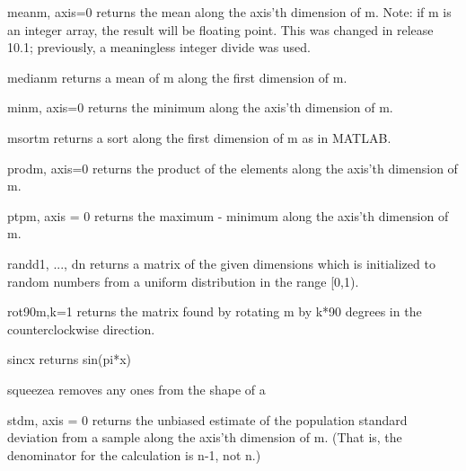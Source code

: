 \begin{funcdesc}{mean}{m, axis=0}
   \label{cha:mlab:mean}
   \label{func:mean}
   returns the mean along the axis'th dimension of m.  Note: if m is an integer
   array, the result will be floating point. This was changed in release 10.1;
   previously, a meaningless integer divide was used.
\end{funcdesc}
\begin{funcdesc}{median}{m}
   \label{cha:mlab:median}
   \label{func:median}
   returns a mean of m along the first dimension of m.
\end{funcdesc}
\begin{funcdesc}{min}{m, axis=0}
   \label{cha:mlab:min}
   \label{func:min}
   returns the minimum along the axis'th dimension of m.
\end{funcdesc}
\begin{funcdesc}{msort}{m}
   \label{cha:mlab:msort}
   \label{func:msort}
   returns a sort along the first dimension of m as in MATLAB.
\end{funcdesc}
\begin{funcdesc}{prod}{m, axis=0}
   \label{cha:mlab:prod}
   \label{func:prod}
   returns the product of the elements along the axis'th dimension of m.
\end{funcdesc}
\begin{funcdesc}{ptp}{m, axis = 0}
   \label{cha:mlab:ptp}
   \label{func:ptp}
   returns the maximum - minimum along the axis'th dimension of m.
\end{funcdesc}
\begin{funcdesc}{rand}{d1, ..., dn}
   \label{cha:mlab:rand}
   \label{func:rand}
   returns a matrix of the given dimensions which is initialized to random numbers from a uniform distribution in
the range [0,1).
\end{funcdesc}
\begin{funcdesc}{rot90}{m,k=1}
   \label{cha:mlab:rot90}
   \label{func:rot90}
   returns the matrix found by rotating m by k*90 degrees in the counterclockwise direction.
\end{funcdesc}
\begin{funcdesc}{sinc}{x}
   \label{cha:mlab:sinc}
   \label{func:sinc}
   returns sin(pi*x)
\end{funcdesc}
\begin{funcdesc}{squeeze}{a}
   \label{cha:mlab:squeeze}
   \label{func:squeeze}
   removes any ones from the shape of a
\end{funcdesc}
\begin{funcdesc}{std}{m, axis = 0}
   \label{cha:mlab:std}
   \label{func:std}
   returns the unbiased estimate of the population standard deviation from a
   sample along the axis'th dimension of m. (That is, the denominator for the
   calculation is n-1, not n.) 
\end{funcdesc}
